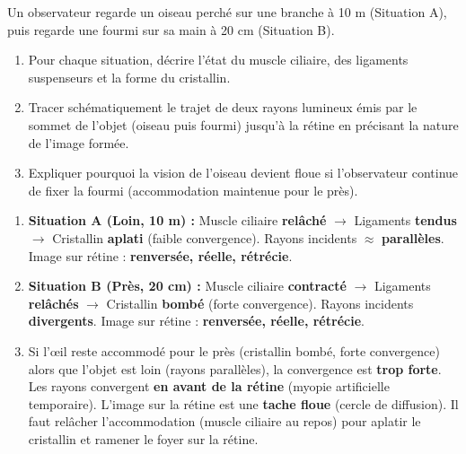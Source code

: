 \documentclass[11pt]{article}
\begin{document}
\begin{exercice}
Un observateur regarde un oiseau perché sur une branche à 10 m (Situation A), puis regarde une fourmi sur sa main à 20 cm (Situation B).
\begin{enumerate}
    \item Pour chaque situation, décrire l'état du muscle ciliaire, des ligaments suspenseurs et la forme du cristallin.
    \item Tracer schématiquement le trajet de deux rayons lumineux émis par le sommet de l'objet (oiseau puis fourmi) jusqu'à la rétine en précisant la nature de l'image formée.
    \item Expliquer pourquoi la vision de l'oiseau devient floue si l'observateur continue de fixer la fourmi (accommodation maintenue pour le près).
\end{enumerate}
\end{exercice}

\begin{corrige}
\begin{enumerate}
    \item \textbf{Situation A (Loin, 10 m) :} Muscle ciliaire \textbf{relâché} $\to$ Ligaments \textbf{tendus} $\to$ Cristallin \textbf{aplati} (faible convergence). Rayons incidents $\approx$ \textbf{parallèles}. Image sur rétine : \textbf{renversée, réelle, rétrécie}.
    \item \textbf{Situation B (Près, 20 cm) :} Muscle ciliaire \textbf{contracté} $\to$ Ligaments \textbf{relâchés} $\to$ Cristallin \textbf{bombé} (forte convergence). Rayons incidents \textbf{divergents}. Image sur rétine : \textbf{renversée, réelle, rétrécie}.
    \item Si l'œil reste accommodé pour le près (cristallin bombé, forte convergence) alors que l'objet est loin (rayons parallèles), la convergence est \textbf{trop forte}. Les rayons convergent \textbf{en avant de la rétine} (myopie artificielle temporaire). L'image sur la rétine est une \textbf{tache floue} (cercle de diffusion). Il faut relâcher l'accommodation (muscle ciliaire au repos) pour aplatir le cristallin et ramener le foyer sur la rétine.
\end{enumerate}
\end{corrige}
\end{document}
